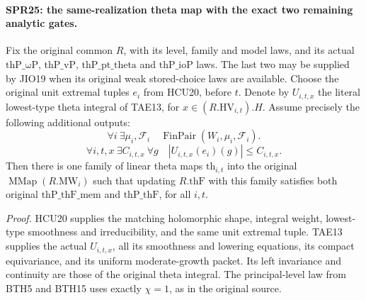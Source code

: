 \documentclass[11pt,a4paper]{article}
\numberwithin{equation}{section}
\theoremstyle{remark}\newtheorem{remark}[theorem]{Remark}
\begin{document}
\paragraph{SPR25: the same-realization theta map with the exact two remaining analytic gates.}
\label{claim:SPR25}
Fix the original common \(R\), with its level, family and model
laws, and its actual \(\mathrm{thP\_\omega P}\),
\(\mathrm{thP\_vP}\), \(\mathrm{thP\_pt\_theta}\) and
\(\mathrm{thP\_ioP}\) laws.  The last two may be supplied by
JIO19 when its original weak stored-choice laws are available.
Choose the original unit extremal tuples \(e_i\) from HCU20,
before \(t\).  Denote by \(U_{i,t,x}\) the literal lowest-type
theta integral of TAE13, for \(x\in(R.\mathrm{HV}_{i,t}).H\).
Assume precisely the following additional outputs:
\[
 \forall i\ \exists\mu_i,\mathcal F_i\quad
       \operatorname{FinPair}(W_i,\mu_i,\mathcal F_i).
 \tag{SPR.51}
\]
\[
 \forall i,t,x\ \exists C_{i,t,x}\ \forall g\quad
       |U_{i,t,x}(e_i)(g)|\le C_{i,t,x}.
 \tag{SPR.52}
\]
Then there is one family of linear theta maps \(\mathrm{th}_{i,t}\)
into the original \(\operatorname{MMap}(R.\mathrm{MW}_i)\)
such that updating \(R.\mathrm{thF}\) with this family satisfies
both original \(\mathrm{thP\_thF\_mem}\) and
\(\mathrm{thP\_thF}\), for all \(i,t\).

\emph{Proof.}
HCU20 supplies the matching holomorphic shape, integral weight,
lowest-type smoothness and irreducibility, and the same unit
extremal tuple.  TAE13 supplies the actual \(U_{i,t,x}\), all
its smoothness and lowering equations, its compact equivariance,
and its uniform moderate-growth packet.  Its left invariance
and continuity are those of the original theta integral.
The principal-level law from BTH5 and BTH15 uses exactly
\(\chi=1\), as in the original source.
\end{document}
